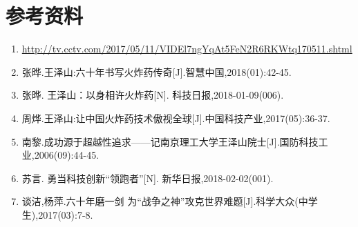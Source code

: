 \documentclass[12pt]{article}%
\begin{document}
\section{参考资料}
\begin{enumerate}[1 ]
\item \url{http://tv.cctv.com/2017/05/11/VIDEl7ngYqAt5FeN2R6RKWtq170511.shtml}
  \item 张晔.王泽山:六十年书写火炸药传奇[J].智慧中国,2018(01):42-45.
  \item 张晔. 王泽山：以身相许火炸药[N]. 科技日报,2018-01-09(006).
  \item 周烨.王泽山:让中国火炸药技术傲视全球[J].中国科技产业,2017(05):36-37.
  \item 南黎.成功源于超越性追求——记南京理工大学王泽山院士[J].国防科技工业,2006(09):44-45.
  \item 苏言. 勇当科技创新“领跑者”[N]. 新华日报,2018-02-02(001).
  \item 谈洁,杨萍.六十年磨一剑 为“战争之神”攻克世界难题[J].科学大众(中学生),2017(03):7-8.
\end{enumerate}
\end{document}
